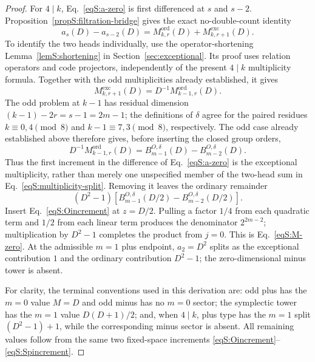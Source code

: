 \documentclass[journal,twocolumn]{IEEEtran}
\theoremstyle{definition}
\theoremstyle{plain}
\newcommand{\Ord}{\mathrm{ord}}
\newcommand{\Exc}{\mathrm{exc}}
\begin{document}
\begin{proof}
For $4\mid k$, Eq.~\eqref{eqS:a-zero} is first differenced at $s$ and
$s-2$.  Proposition~\ref{propS:filtration-bridge} gives the exact
no-double-count identity
\begin{equation}
 a_s(D)-a_{s-2}(D)
 =M^{\Ord}_{k,r}(D)+M^{\Exc}_{k,r+1}(D).
 \label{eqS:multiplicity-split}
\end{equation}
To identify the two heads individually, use the operator-shortening
Lemma~\ref{lemS:shortening} in Section~\ref{sec:exceptional}.  Its proof uses relation operators
and code projectors, independently of the present $4\mid k$ multiplicity
formula.  Together with the odd multiplicities already established, it gives
\begin{equation}
 M^{\Exc}_{k,r+1}(D)=D^{-1}M^{\Ord}_{k-1,r}(D).
 \label{eqS:exceptional-head-by-shortening}
\end{equation}
The odd problem at $k-1$ has residual dimension
$(k-1)-2r=s-1=2m-1$; the definitions of $\delta$ agree for the paired
residues $k\equiv0,4\pmod8$ and $k-1\equiv7,3\pmod8$, respectively.
The odd case already established above therefore
gives, before inserting the closed group orders,
\begin{equation}
 D^{-1}M^{\Ord}_{k-1,r}(D)
 =B_{m-1}^{O,\delta}(D)-B_{m-2}^{O,\delta}(D).
 \label{eqS:exceptional-head-increment}
\end{equation}
Thus the first increment in the difference of Eq.~\eqref{eqS:a-zero} is
the exceptional multiplicity, rather than merely one unspecified member
of the two-head sum in Eq.~\eqref{eqS:multiplicity-split}.  Removing it
leaves the ordinary remainder
\begin{equation}
 (D^2-1)[B_{m-1}^{O,\delta}(D/2)
          -B_{m-2}^{O,\delta}(D/2)].
 \label{eqS:ordinary-remainder}
\end{equation}
Insert Eq.~\eqref{eqS:Oincrement} at $z=D/2$.  Pulling a factor $1/4$ from
each quadratic term and $1/2$ from each linear term produces the denominator
$2^{2m-2}$; multiplication by $D^2-1$ completes the product from $j=0$.
This is Eq.~\eqref{eqS:M-zero}.  At the admissible $m=1$ plus endpoint,
$a_2=D^2$ splits as the exceptional contribution $1$ and the ordinary
contribution $D^2-1$; the zero-dimensional minus tower is absent.

For clarity, the terminal conventions used in this derivation are: odd plus
has the $m=0$ value $M=D$ and odd minus has no $m=0$ sector; the symplectic
tower has the $m=1$ value $D(D+1)/2$; and, when $4\mid k$, plus type has the
$m=1$ split $(D^2-1)+1$, while the corresponding minus sector is absent.
All remaining values follow from the same two fixed-space increments
\eqref{eqS:Oincrement}--\eqref{eqS:Spincrement}.
\end{proof}
\end{document}
